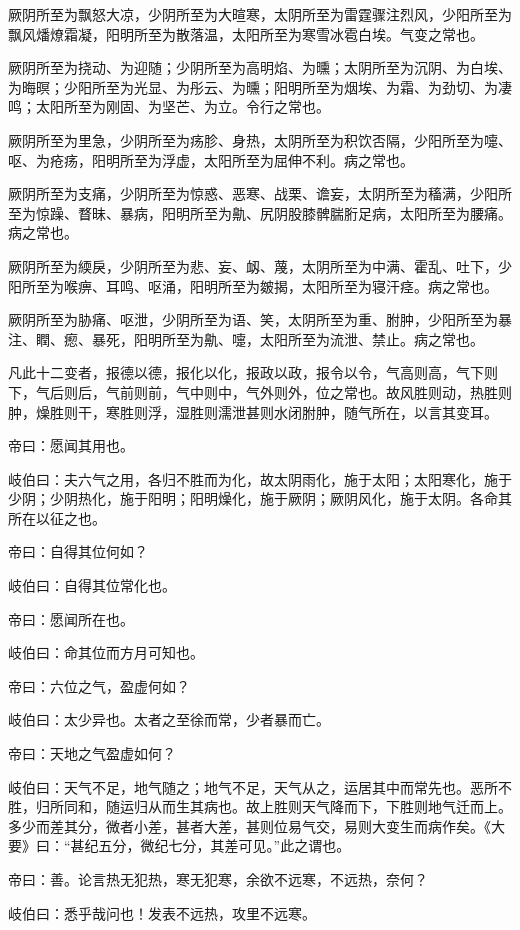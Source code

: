 \documentclass{article}%
\begin{document}
厥阴所至为飘怒大凉，少阴所至为大暄寒，太阴所至为雷霆骤注烈风，少阳所至为飘风燔燎霜凝，阳明所至为散落温，太阳所至为寒雪冰雹白埃。气变之常也。

厥阴所至为挠动、为迎随；少阴所至为高明焰、为曛；太阴所至为沉阴、为白埃、为晦暝；少阳所至为光显、为彤云、为曛；阳明所至为烟埃、为霜、为劲切、为凄鸣；太阳所至为刚固、为坚芒、为立。令行之常也。

厥阴所至为里急，少阴所至为疡胗、身热，太阴所至为积饮否隔，少阳所至为嚏、呕、为疮疡，阳明所至为浮虚，太阳所至为屈伸不利。病之常也。

厥阴所至为支痛，少阴所至为惊惑、恶寒、战栗、谵妄，太阴所至为稸满，少阳所至为惊躁、瞀昧、暴病，阳明所至为鼽、尻阴股膝髀腨胻足病，太阳所至为腰痛。病之常也。

厥阴所至为緛戾，少阴所至为悲、妄、衂、蔑，太阴所至为中满、霍乱、吐下，少阳所至为喉痹、耳鸣、呕涌，阳明所至为皴揭，太阳所至为寝汗痉。病之常也。

厥阴所至为胁痛、呕泄，少阴所至为语、笑，太阴所至为重、胕肿，少阳所至为暴注、瞤、瘛、暴死，阳明所至为鼽、嚏，太阳所至为流泄、禁止。病之常也。

凡此十二变者，报德以德，报化以化，报政以政，报令以令，气高则高，气下则下，气后则后，气前则前，气中则中，气外则外，位之常也。故风胜则动，热胜则肿，燥胜则干，寒胜则浮，湿胜则濡泄甚则水闭胕肿，随气所在，以言其变耳。

帝曰：愿闻其用也。

岐伯曰：夫六气之用，各归不胜而为化，故太阴雨化，施于太阳；太阳寒化，施于少阴；少阴热化，施于阳明；阳明燥化，施于厥阴；厥阴风化，施于太阴。各命其所在以征之也。

帝曰：自得其位何如？

岐伯曰：自得其位常化也。

帝曰：愿闻所在也。

岐伯曰：命其位而方月可知也。

帝曰：六位之气，盈虚何如？

岐伯曰：太少异也。太者之至徐而常，少者暴而亡。

帝曰：天地之气盈虚如何？

岐伯曰：天气不足，地气随之；地气不足，天气从之，运居其中而常先也。恶所不胜，归所同和，随运归从而生其病也。故上胜则天气降而下，下胜则地气迁而上。多少而差其分，微者小差，甚者大差，甚则位易气交，易则大变生而病作矣。《大要》曰：“甚纪五分，微纪七分，其差可见。”此之谓也。

帝曰：善。论言热无犯热，寒无犯寒，余欲不远寒，不远热，奈何？

岐伯曰：悉乎哉问也！发表不远热，攻里不远寒。
\end{document}
